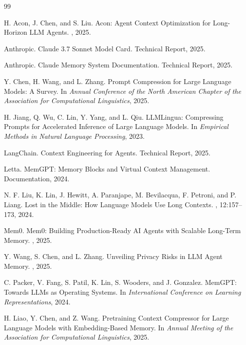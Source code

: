 \documentclass[11pt]{book}
\begin{document}
\begin{thebibliography}{99}

H. Acon, J. Chen, and S. Liu.
\newblock Acon: Agent Context Optimization for Long-Horizon LLM Agents.
, 2025.

Anthropic.
\newblock Claude 3.7 Sonnet Model Card.
\newblock Technical Report, 2025.

Anthropic.
\newblock Claude Memory System Documentation.
\newblock Technical Report, 2025.

Y. Chen, H. Wang, and L. Zhang.
\newblock Prompt Compression for Large Language Models: A Survey.
\newblock In {\em Annual Conference of the North American Chapter of the Association for Computational Linguistics}, 2025.

H. Jiang, Q. Wu, C. Lin, Y. Yang, and L. Qiu.
\newblock LLMLingua: Compressing Prompts for Accelerated Inference of Large Language Models.
\newblock In {\em Empirical Methods in Natural Language Processing}, 2023.

LangChain.
\newblock Context Engineering for Agents.
\newblock Technical Report, 2025.

Letta.
\newblock MemGPT: Memory Blocks and Virtual Context Management.
\newblock Documentation, 2024.

N. F. Liu, K. Lin, J. Hewitt, A. Paranjape, M. Bevilacqua, F. Petroni, and P. Liang.
\newblock Lost in the Middle: How Language Models Use Long Contexts.
, 12:157--173, 2024.

Mem0.
\newblock Mem0: Building Production-Ready AI Agents with Scalable Long-Term Memory.
, 2025.

Y. Wang, S. Chen, and L. Zhang.
\newblock Unveiling Privacy Risks in LLM Agent Memory.
, 2025.

C. Packer, V. Fang, S. Patil, K. Lin, S. Wooders, and J. Gonzalez.
\newblock MemGPT: Towards LLMs as Operating Systems.
\newblock In {\em International Conference on Learning Representations}, 2024.

H. Liao, Y. Chen, and Z. Wang.
\newblock Pretraining Context Compressor for Large Language Models with Embedding-Based Memory.
\newblock In {\em Annual Meeting of the Association for Computational Linguistics}, 2025.


\end{thebibliography}
\end{document}
